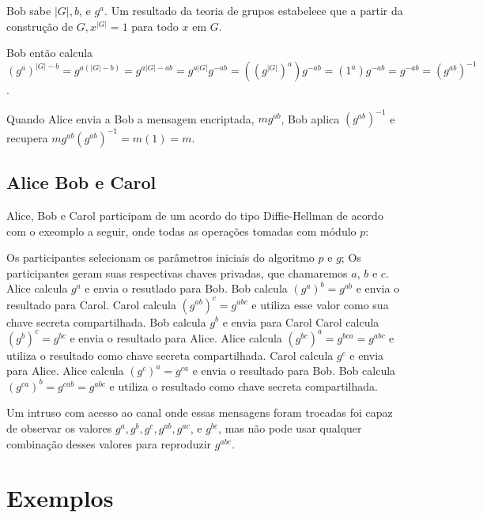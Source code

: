 \documentclass[a4paper,11pt]{article}
\theoremstyle{mytheor}
\begin{document}
    Bob sabe $|G|, b$, e $g^a$. Um resultado da teoria de grupos estabelece que a partir da construção de $G, x^{|G|} = 1$ para todo $x$ em $G$.
    
    Bob então calcula $(g^a)^{|G|-b} = g^{a(|G|-b)} = g^{a|G|-ab} = g^{a|G|}g^{-ab} = ((g^{|G|})^a)g^{-ab}=(1^a)g^{-ab}=g^{-ab}=(g^{ab})^{-1}$.
    
    Quando Alice envia a Bob a mensagem encriptada, $mg^{ab}$, Bob aplica $(g^{ab})^{-1}$ e recupera $mg^{ab}(g^{ab})^{-1} = m(1) = m$.

\subsection*{Alice Bob e Carol}

Alice, Bob e Carol participam de um acordo do tipo Diffie-Hellman de acordo com o exeomplo a seguir, onde todas as operações tomadas com módulo $p$:

    Os participantes selecionam os parâmetros iniciais do algoritmo $p$ e $g$;
    Os participantes geram suas respectivas chaves privadas, que chamaremos $a$, $b$ e $c$.
    Alice calcula $g^a$ e envia o resutlado para Bob.
    Bob calcula $(g^a)^b = g^{ab}$ e envia o resultado para Carol.
    Carol calcula $(g^{ab})^c = g^{abc}$ e utiliza esse valor como sua chave secreta compartilhada.
    Bob calcula $g^b$ e envia para Carol
    Carol calcula $(g^b)^c = g^{bc}$ e envia o resultado para Alice.
    Alice calcula $(g^{bc})^a = g^{bca} = g^{abc}$ e utiliza o resultado como chave secreta compartilhada.
    Carol calcula $g^c$ e envia para Alice.
    Alice calcula $(g^c)^a = g^{ca}$ e envia o resultado para Bob.
    Bob calcula $(g^{ca})^b = g^{cab} = g^{abc}$ e utiliza o resultado como chave secreta compartilhada.

Um intruso com acesso ao canal onde essas mensagens foram trocadas foi capaz de observar os valores $g^a, g^b, g^c, g^{ab}, g^{ac}$, e $g^{bc}$, mas não pode usar qualquer combinação desses valores para reproduzir $g^{abc}$.

\section*{Exemplos}
\end{document}
